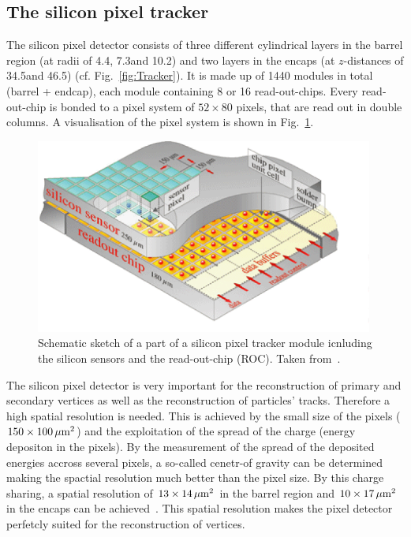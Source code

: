 \subsection*{The silicon pixel tracker}
The silicon pixel detector consists of three different cylindrical layers in the barrel region (at radii of 4.4\cm, 7.3\cm and 10.2\cm) and two layers in the encaps (at $z$-distances of 34.5\cm and 46.5\cm) (cf. Fig.~\ref{fig:Tracker}).
It is made up of 1440 modules in total (barrel + endcap), each module containing 8 or 16 read-out-chips.
Every read-out-chip is bonded to a pixel system of $52\times80$ pixels, that are read out in double columns.
A visualisation of the pixel system is shown in Fig.~\ref{fig:PixelTracker}.
\begin{figure}[!b]
  \centering
      \includegraphics[width=0.99\textwidth]{figures/experiment/CMS/Pixelement.png}
  \caption{Schematic sketch of a part of a silicon pixel tracker module icnluding the silicon sensors and the read-out-chip (ROC). Taken from~\cite{bib:CMS:tracking_8TeV}.}  
  \label{fig:PixelTracker}
\end{figure}

The silicon pixel detector is very important for the reconstruction of primary and secondary vertices as well as the reconstruction of particles' tracks.
Therefore a high spatial resolution is needed.
This is achieved by the small size of the pixels ($ 150 \times 100 \,\mu\text{m}^2$) and the exploitation of the spread of the charge (energy depositon in the pixels).
By the measurement of the spread of the deposited energies accross several pixels, a so-called cenetr-of gravity can be determined making the spactial resolution much better than the pixel size.
By this charge sharing, a spatial resolution of $13\times14\,\mu\text{m}^2$ in the barrel region and $10\times17\,\mu\text{m}^2$ in the encaps can be achieved~\cite{FIXME}. 
This spatial resolution makes the pixel detector perfetcly suited for the reconstruction of vertices.



